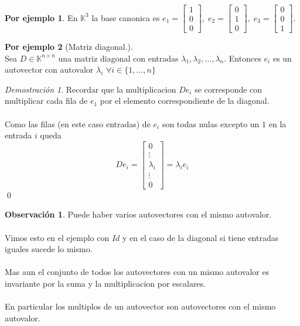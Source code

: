 \documentclass{article}
\theoremstyle{definition}
\theoremstyle{definition}
\newtheorem*{obs}{Observación}
\newtheorem*{ej}{Por ejemplo}
\theoremstyle{remark}
\newtheorem*{demo}{Demostración}
\begin{document}
\begin{ej}
  En $\mathbb{K}^3$ la base canonica es $e_1=\begin{bmatrix} 1 \\ 0 \\ 0 \end{bmatrix}, \; e_2=\begin{bmatrix}0 \\ 1 \\ 0\end{bmatrix}, \; e_3 =\begin{bmatrix} 0 \\ 0 \\ 1\end{bmatrix}$. 
\end{ej}
\begin{ej}[Matriz diagonal.] \;\\
Sea $D \in \mathbb{K}^{n \times n}$ una matriz diagonal con entradas $\lambda_1, \lambda_2, \dots ,\lambda_n$. Entonces $e_i$ es un autovector con autovalor $\lambda_i$ $\forall i \in \{1, \dots ,n\}$
\end{ej}
\begin{demo}
  Recordar que la multiplicacion $De_i$ se corresponde con multiplicar cada fila de $e_1$ por el elemento correspondiente de la diagonal. \\\\ Como las filas (en este caso entradas) de $e_i$ son todas nulas excepto un $1$ en la entrada $i$ queda \[
    De_i =\begin{bmatrix} 0 \\ \vdots \\ \lambda_i \\ \vdots \\ 0 \end{bmatrix} = \lambda_i e_i
  \]
  \qed
\end{demo}
\begin{obs}
  Puede haber varios autovectores con el mismo autovalor. \\\\ Vimos esto en el ejemplo con $Id$ y en el caso de la diagonal si tiene entradas iguales sucede lo mismo. \\ \\ Mas aun el conjunto de todos los autovectores con un mismo autovalor es invariante por la suma y la multiplicacion por escalares. \\\\
  En particular los multiplos de un autovector son autovectores con el mismo autovalor.
\end{obs}
\end{document}
